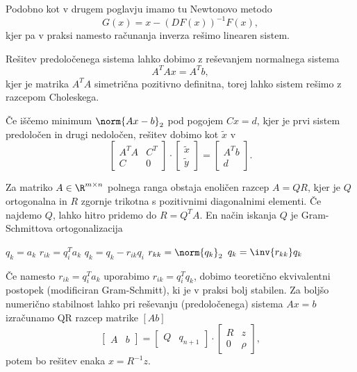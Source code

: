 Podobno kot v drugem poglavju imamo tu Newtonovo metodo
\[
  G(x) = x - (DF(x))^{-1} F(x),
\]
kjer pa v praksi namesto računanja inverza rešimo linearen sistem.


Rešitev predoločenega sistema lahko dobimo z reševanjem normalnega sistema
\[
  A^T A x = A^T b,
\]
kjer je matrika $A^T A$ simetrična pozitivno definitna, torej lahko sistem
rešimo z razcepom Choleskega.

Če iščemo minimum $\norm{A x - b}_2$ pod pogojem $Cx = d$, kjer je prvi sistem
predoločen in drugi nedoločen, rešitev dobimo kot $\tilde{x}$ v
\[
  \begin{bmatrix}
	A^T A & C^T \\ C & 0
  \end{bmatrix}
  \cdot
  \begin{bmatrix}
	\tilde{x} \\ \tilde{y}
  \end{bmatrix}
  =
  \begin{bmatrix}
	A^T b \\ d
  \end{bmatrix}.
\]


Za matriko $A \in \R^{m \times n}$ polnega ranga obstaja enoličen razcep $A =
QR$, kjer je $Q$ ortogonalna in $R$ zgornje trikotna s pozitivnimi diagonalnimi
elementi.
Če najdemo $Q$, lahko hitro pridemo do $R = Q^T A$.
En način iskanja $Q$ je Gram-Schmittova ortogonalizacija

\begin{algorithm}
  \caption{QR razcep s klasičnim Gram-Schmittovim postopkom}
  \begin{algorithmic}
	\State $q_k = a_k$
	\State $r_{ik} = q_i^T a_k$
	\State $q_k = q_k - r_{ik} q_i$
	\EndFor
	\State $r_{kk} = \norm{q_k}_2$
	\State $q_k = \inv{r_{kk}} q_k$
	\EndFor
  \end{algorithmic}
\end{algorithm}

Če namesto $r_{ik} = q_i^T a_k$ uporabimo $r_{ik} = q_i^T q_k$, dobimo
teoretično ekvivalentni postopek (modificiran Gram-Schmitt), ki je v praksi bolj
stabilen.
Za boljšo numerično stabilnost lahko pri reševanju (predoločenega) sistema $Ax =
b$ izračunamo QR razcep matrike $\left[ A b \right]$
\[
  \begin{bmatrix}
	A & b
  \end{bmatrix}
  =
  \begin{bmatrix}
	Q & q_{n+1}
  \end{bmatrix}
  \cdot
  \begin{bmatrix}
	R & z \\ 0 & \rho
  \end{bmatrix},
\]
potem bo rešitev enaka $x = R^{-1} z$.

